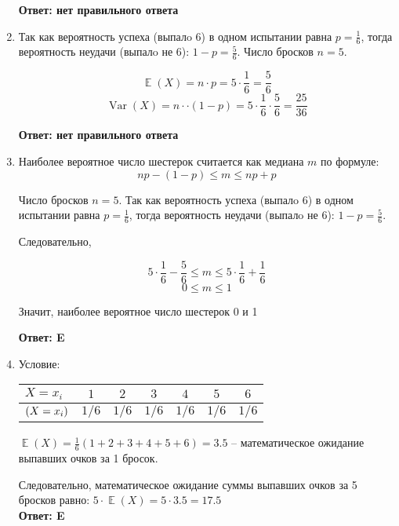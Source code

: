 \documentclass[112pt, cmcyralt]{article}
\DeclareMathOperator{\Var}{Var}
\DeclareMathOperator{\E}{\mathbb{E}}
\let\P\relax
\DeclareMathOperator{\P}{\mathbb{P}}
\begin{document}
\begin{enumerate}
\textbf{Ответ: нет правильного ответа}


\item 

Так как вероятность успеха (выпалo 6) в одном испытании равна $p = \frac{1}{6}$, тогда вероятность неудачи (выпалo не 6): $1-p = \frac{5}{6}$. Число бросков $n = 5$.

\[
\E(X) = n\cdot p= 5\cdot\frac{1}{6}=\frac{5}{6}
\]
\[
\Var(X)=n\cdotp\cdot(1-p) = 5\cdot\frac{1}{6}\cdot\frac{5}{6}=\frac{25}{36}
\]

\textbf{Ответ: нет правильного ответа}


\item

Наиболее вероятное число шестерок считается как медиана $m$ по формуле:
\[
np - (1-p) \leqslant m \leqslant np + p
\]

Число бросков $n = 5$. Так как вероятность успеха (выпалo 6) в одном испытании равна $p = \frac{1}{6}$, тогда вероятность неудачи (выпалo не 6): $1 - p = \frac{5}{6}$. 

Следовательно, 

\[
5\cdot\frac{1}{6} - \frac{5}{6} \leqslant m \leqslant 5\cdot \frac{1}{6} + \frac{1}{6}
\]
\[
0 \leqslant m \leqslant 1
\]

Значит, наиболее вероятное число шестерок 0 и 1

\textbf{Ответ: E}


\item 
Условие:
\begin{center}
    \vspace{5mm}
    \begin{tabular}{lcccccc}
    \toprule
      $X=x_i$    & $1$   & $2$   & $3$   & $4$   & $5$   & $6$  \\
      \midrule
      $\P(X=x_i)$ & $1/6$ & $1/6$ & $1/6$ & $1/6$ & $1/6$ & $1/6$  \\
    \bottomrule
    \end{tabular}
    \vspace{5mm}   
\end{center}



$\E(X) = \frac{1}{6}(1 + 2 + 3 + 4 + 5 + 6) = 3.5$
-- математическое ожидание выпавших очков за 1 бросок.

Следовательно, математическое ожидание суммы выпавших очков за 5 бросков равно: 
$5\cdot \E(X)=5\cdot3.5=17.5$\\

\textbf{Ответ: E}



\end{enumerate}
\end{document}

